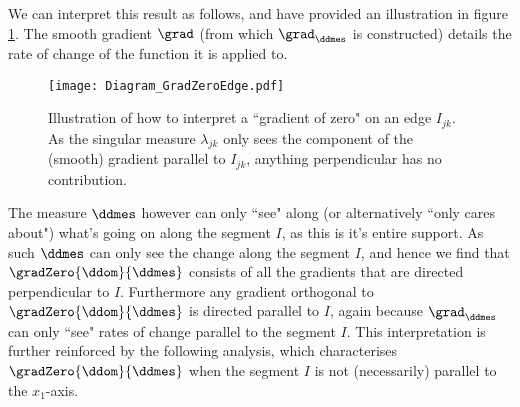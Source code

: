 We can interpret this result as follows, and have provided an illustration in figure \ref{fig:GradZeroEdge}.
The smooth gradient $\grad$ (from which $\grad_\ddmes$ is constructed) details the rate of change of the function it is applied to.
\begin{figure}[b]
	\centering
	\texttt{[image: Diagram\_GradZeroEdge.pdf]}
	\caption{\label{fig:GradZeroEdge} Illustration of how to interpret a ``gradient of zero" on an edge $I_{jk}$. As the singular measure $\lambda_{jk}$ only sees the component of the (smooth) gradient parallel to $I_{jk}$, anything perpendicular has no contribution.}
\end{figure}
The measure $\ddmes$ however can only ``see" along (or alternatively ``only cares about") what's going on along the segment $I$, as this is it's entire support.
As such $\ddmes$ can only see the change along the segment $I$, and hence we find that $\gradZero{\ddom}{\ddmes}$ consists of all the gradients that are directed perpendicular to $I$.
Furthermore any gradient orthogonal to $\gradZero{\ddom}{\ddmes}$ is directed parallel to $I$, again because $\grad_\ddmes$ can only ``see" rates of change parallel to the segment $I$.
This interpretation is further reinforced by the following analysis, which characterises $\gradZero{\ddom}{\ddmes}$ when the segment $I$ is not (necessarily) parallel to the $x_1$-axis. \newline

